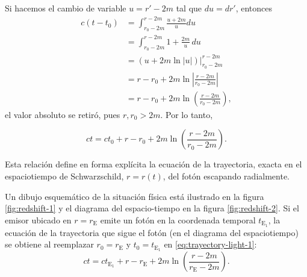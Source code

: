 \documentclass[letterpaper,11pt]{article}
\begin{document}
Si hacemos el cambio de variable $u = r'-2m$ tal que $du = dr'$, entonces 
\begin{align}
c(t-t_0) &= \int_{r_0 - 2m}^{r - 2m} \frac{u + 2m}{u} du \nonumber \\
&= \int_{r_0 - 2m}^{r - 2m} 1 + \frac{2m}{u} \, du\nonumber \\
&= (u + 2m\ln|u|)|_{r_0-2m}^{r - 2m}\nonumber \\
&= r - r_0 + 2m\ln\left| \frac{r-2m}{r_0-2m} \right| \nonumber\\
&= r - r_0 + 2m\ln \left(\frac{r-2m}{r_0-2m}\right),
\end{align} 
el valor absoluto se retiró, pues $r,r_0 > 2m$. Por lo tanto,
\begin{shaded}
\begin{equation}
ct = ct_0 +  r - r_0 + 2m \ln \left(\frac{r-2m}{r_0-2m}\right). \label{eq:trayectory-light-1}
\end{equation}
\end{shaded}

Esta relación define en forma explícita la ecuación de la trayectoria, exacta en el espaciotiempo de Schwarzschild, $r = r(t)$, del fotón escapando radialmente. 

Un dibujo esquemático de la situación física está ilustrado en la figura \ref{fig:redshift-1} y el diagrama del espacio-tiempo en la figura \ref{fig:redshift-2}. Si el emisor ubicado en $r = r_{\text{E}}$ emite un fotón en la coordenada temporal $t_{\text{E}_1}$, la ecuación de la trayectoria que sigue el fotón (en el diagrama del espaciotiempo) se obtiene al reemplazar $r_0 = r_{\text{E}}$ y $t_0 = t_{\text{E}_1}$ en \eqref{eq:trayectory-light-1}:
\begin{equation}
ct = ct_{\text{E}_1} + r - r_{\text{E}} + 2m \ln\left( \frac{r-2m}{r_{\text{E}} - 2m}\right). \label{eq:trayectory-light-2}
\end{equation}
\end{document}

